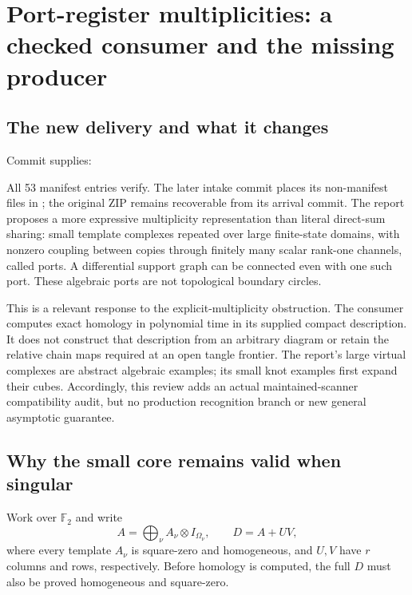 \section{Port-register multiplicities: a checked consumer and the missing producer}
\label{sec:port-register-review}

\subsection{The new delivery and what it changes}
Commit  supplies:
\begin{center}\small
{}
\end{center}
All 53 manifest entries verify. The later intake commit 
places its non-manifest files in ; the original ZIP remains
recoverable from its arrival commit. The report proposes a more expressive
multiplicity representation than literal direct-sum sharing: small template
complexes repeated over large finite-state domains, with nonzero coupling
between copies through finitely many scalar rank-one channels, called ports.
A differential support graph can be connected even with one such port.
These algebraic ports are not topological boundary circles.

This is a relevant response to the explicit-multiplicity obstruction. The
consumer computes exact homology in polynomial time in its supplied compact
description. It does not construct that description from an arbitrary diagram
or retain the relative chain maps required at an open tangle frontier. The
report's large virtual complexes are abstract algebraic examples; its small
knot examples first expand their cubes. Accordingly, this review adds an
actual maintained-scanner compatibility audit, but no production recognition
branch or new general asymptotic guarantee.

\subsection{Why the small core remains valid when singular}
Work over $\mathbb F_2$ and write
\[
 A=\bigoplus_\nu A_\nu\otimes I_{\Omega_\nu},\qquad D=A+UV,
\]
where every template $A_\nu$ is square-zero and homogeneous, and $U,V$ have
$r$ columns and rows, respectively. Before homology is computed, the full
$D$ must also be proved homogeneous and square-zero.


